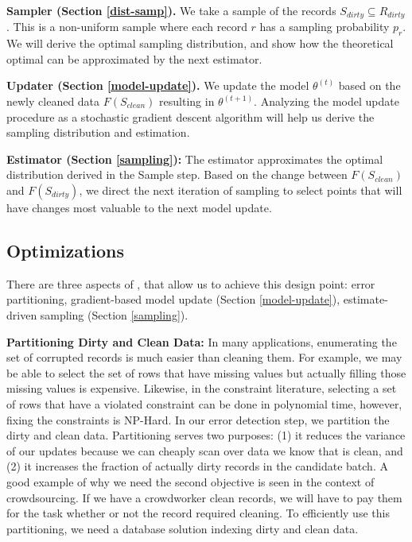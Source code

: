 \vspace{0.5em}

\noindent\textbf{Sampler (Section \ref{dist-samp}). } We take a sample of the records $S_{dirty} \subseteq R_{dirty}$. This is a non-uniform sample where each record $r$ has a sampling probability $p_r$.
We will derive the optimal sampling distribution, and show how the theoretical optimal can be approximated by the next estimator.

\vspace{0.5em}

\noindent\textbf{Updater (Section \ref{model-update}). } We update the model $\theta^{(t)}$ based on the newly cleaned data $F(S_{clean})$ resulting in $\theta^{(t+1)}$. Analyzing the model update procedure as a stochastic gradient descent algorithm will help us derive the sampling distribution and estimation.

\vspace{0.5em}

\noindent\textbf{Estimator (Section \ref{sampling}): } The estimator approximates the optimal distribution derived in the Sample step. Based on the change between $F(S_{clean})$ and $F(S_{dirty})$, we direct the next iteration of sampling to select points that will have changes most valuable to the next model update.

\iffalse
\subsection{Optimizations}
There are three aspects of \sys, that allow us to achieve this design point: error partitioning, gradient-based model update (Section \ref{model-update}), estimate-driven sampling (Section \ref{sampling}).

\vspace{0.5em}

\noindent\textbf{Partitioning Dirty and Clean Data: } In many applications, enumerating the set of corrupted records is much easier than cleaning them. For example, we may be able to select the set of rows that have missing values but actually filling those missing values is expensive. Likewise, in the constraint literature, selecting a set of rows that have a violated constraint can be done in polynomial time, however, fixing the constraints is NP-Hard.
In our error detection step, we partition the dirty and clean data.
Partitioning serves two purposes: (1) it reduces the variance of our updates because we can cheaply scan over data we know that is clean, and (2) it increases the fraction of actually dirty records in the candidate batch.
A good example of why we need the second objective is seen in the context of crowdsourcing.
If we have a crowdworker clean records, we will have to pay them for the task whether or not the record required cleaning.
To efficiently use this partitioning, we need a database solution indexing dirty and clean data.

